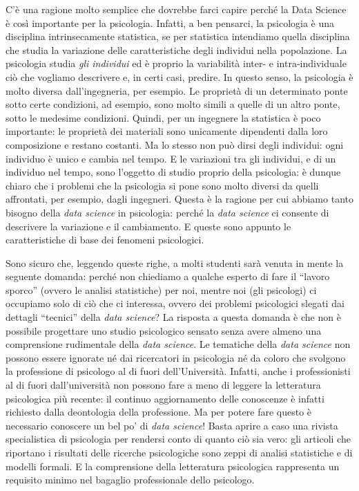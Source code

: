 \documentclass[
  10pt,
  italian,
  a4paper,
  extrafontsizes,onecolumn,openright
  ]{memoir}
\theoremstyle{definition}
\theoremstyle{definition}
\theoremstyle{definition}
\theoremstyle{definition}
\theoremstyle{remark}
\begin{document}
C'è una ragione molto semplice che dovrebbe farci capire perché la Data Science è così importante per la psicologia. Infatti, a ben pensarci, la psicologia è una disciplina intrinsecamente statistica, se per statistica intendiamo quella disciplina che studia la variazione delle caratteristiche degli individui nella popolazione. La psicologia studia \emph{gli individui} ed è proprio la variabilità inter- e intra-individuale ciò che vogliamo descrivere e, in certi casi, predire. In questo senso, la psicologia è molto diversa dall'ingegneria, per esempio. Le proprietà di un determinato ponte sotto certe condizioni, ad esempio, sono molto simili a quelle di un altro ponte, sotto le medesime condizioni. Quindi, per un ingegnere la statistica è poco importante: le proprietà dei materiali sono unicamente dipendenti dalla loro composizione e restano costanti. Ma lo stesso non può dirsi degli individui: ogni individuo è unico e cambia nel tempo. E le variazioni tra gli individui, e di un individuo nel tempo, sono l'oggetto di studio proprio della psicologia: è dunque chiaro che i problemi che la psicologia si pone sono molto diversi da quelli affrontati, per esempio, dagli ingegneri. Questa è la ragione per cui abbiamo tanto bisogno della \emph{data science} in psicologia: perché la \emph{data science} ci consente di descrivere la variazione e il cambiamento. E queste sono appunto le caratteristiche di base dei fenomeni psicologici.

Sono sicuro che, leggendo queste righe, a molti studenti sarà venuta in mente la seguente domanda: perché non chiediamo a qualche esperto di fare il ``lavoro sporco'' (ovvero le analisi statistiche) per noi, mentre noi (gli psicologi) ci occupiamo solo di ciò che ci interessa, ovvero dei problemi psicologici slegati dai dettagli ``tecnici'' della \emph{data science}?
La risposta a questa domanda è che non è possibile progettare uno studio psicologico sensato senza avere almeno una comprensione rudimentale della \emph{data science}. Le tematiche della \emph{data science} non possono essere ignorate né dai ricercatori in psicologia né da coloro che svolgono la professione di psicologo al di fuori dell'Università. Infatti, anche i professionisti al di fuori dall'università non possono fare a meno di leggere la letteratura psicologica più recente: il continuo aggiornamento delle conoscenze è infatti richiesto dalla deontologia della professione. Ma per potere fare questo è necessario conoscere un bel po' di \emph{data science}! Basta aprire a caso una rivista specialistica di psicologia per rendersi conto di quanto ciò sia vero: gli articoli che riportano i risultati delle ricerche psicologiche sono zeppi di analisi statistiche e di modelli formali. E la comprensione della letteratura psicologica rappresenta un requisito minimo nel bagaglio professionale dello psicologo.
\end{document}

